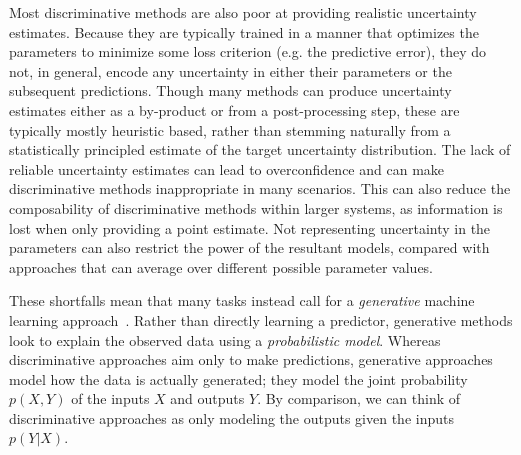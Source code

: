 Most discriminative methods are also poor at providing realistic uncertainty estimates.
Because they are typically trained in a manner that optimizes the parameters to minimize
some loss criterion (e.g. the predictive error), they do not, in general, encode any uncertainty
in either their parameters or the subsequent predictions.  Though many methods can
produce uncertainty estimates either as a by-product or from a post-processing step,
these are typically mostly heuristic based, rather than stemming naturally from a statistically
principled estimate of the target uncertainty distribution.   The lack of reliable uncertainty
estimates can lead to overconfidence and can make discriminative methods inappropriate in
many scenarios.  This can also reduce the composability of discriminative methods within
larger systems, as information is lost when only providing a point estimate.
Not representing uncertainty in the parameters can also restrict the power of the resultant
models, compared with approaches that can average over different possible parameter values.

These shortfalls mean that many tasks instead call for a \emph{generative} machine learning
approach~\citep{ng2002discriminative,bishop2006pattern}.  Rather than directly learning a 
predictor, generative methods look to explain the observed data using a \emph{probabilistic model}.
Whereas discriminative approaches aim only to make predictions, generative approaches model
how the data is actually generated; they model the joint probability $p(X,Y)$ of the inputs 
$X$ and outputs $Y$.  By comparison, we can think of discriminative approaches as
only modeling the outputs given the inputs $p(Y|X)$.  


